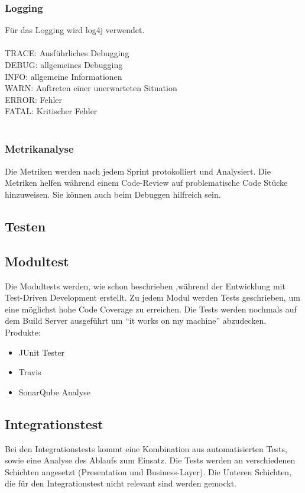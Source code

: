 \subsubsection{Logging}
Für das Logging wird log4j verwendet.\\
\\
TRACE: Ausführliches Debugging\\
DEBUG: allgemeines Debugging\\
INFO: allgemeine Informationen\\
WARN: Auftreten einer unerwarteten Situation\\
ERROR: Fehler\\
FATAL: Kritischer Fehler\\
\\

\subsubsection{Metrikanalyse}
Die Metriken werden nach jedem Sprint protokolliert und Analysiert. 
Die Metriken helfen während einem Code-Review auf problematische 
Code Stücke hinzuweisen. Sie können auch beim Debuggen hilfreich sein.


\subsection{Testen}

\subsection{Modultest}
Die Modultests werden, wie schon beschrieben ,während der Entwicklung mit Test-Driven Development erstellt.
Zu jedem Modul werden Tests geschrieben, um eine möglichst hohe Code 
Coverage zu erreichen.
Die Tests werden nochmals auf dem Build Server ausgeführt um ``it 
works on my machine'' abzudecken.\\

Produkte:
\begin{itemize}
\item JUnit Tester
\item Travis
\item SonarQube Analyse
\end{itemize}

\subsection{Integrationstest}
Bei den Integrationstests kommt eine Kombination aus automatisierten Tests, 
sowie eine Analyse des Ablaufs zum Einsatz.
Die Tests werden an verschiedenen Schichten angesetzt (Presentation und Business-Layer). 
Die Unteren Schichten, die für den Integrationstest nicht relevant sind werden gemockt. \\

